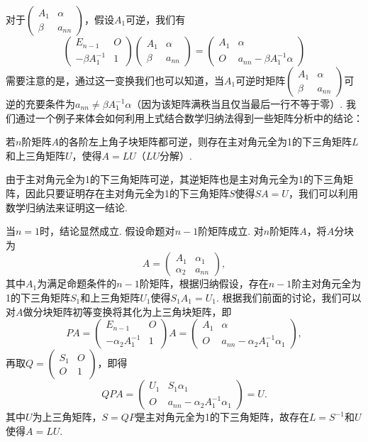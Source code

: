 对于$\begin{pmatrix}
        A_1 & \alpha \\ \beta & a_{nn}
    \end{pmatrix}$，假设$A_1$可逆，我们有
\[\begin{pmatrix}
        E_{n-1} & O \\ -\beta A_1^{-1} & 1
    \end{pmatrix}\begin{pmatrix}
        A_1 & \alpha \\ \beta & a_{nn}
    \end{pmatrix}=\begin{pmatrix}
        A_1 & \alpha \\ O & a_{nn}-\beta A_1^{-1}\alpha
    \end{pmatrix}\]
需要注意的是，通过这一变换我们也可以知道，当$A_1$可逆时矩阵$\begin{pmatrix}
        A_1 & \alpha \\ \beta & a_{nn}
    \end{pmatrix}$可逆的充要条件为$a_{nn}\neq \beta A_1^{-1}\alpha$（因为该矩阵满秩当且仅当最后一行不等于零）. 我们通过一个例子来体会如何利用上式结合数学归纳法得到一些矩阵分析中的结论：
\begin{example}{}{}
    若$n$阶矩阵$A$的各阶左上角子块矩阵都可逆，则存在主对角元全为1的下三角矩阵$L$和上三角矩阵$U$，使得$A=LU$（$LU$分解）.
\end{example}

\begin{solution}
    由于主对角元全为1的下三角矩阵可逆，其逆矩阵也是主对角元全为1的下三角矩阵，因此只要证明存在主对角元全为1的下三角矩阵$S$使得$SA=U$，我们可以利用数学归纳法来证明这一结论.

    当$n=1$时，结论显然成立. 假设命题对$n-1$阶矩阵成立. 对$n$阶矩阵$A$，将$A$分块为
    \[A=\begin{pmatrix}
            A_1 & \alpha_1 \\ \alpha_2 & a_{nn}
        \end{pmatrix},\]
    其中$A_1$为满足命题条件的$n-1$阶矩阵，根据归纳假设，存在$n-1$阶主对角元全为1的下三角矩阵$S_1$和上三角矩阵$U_1$使得$S_1A_1=U_1$. 根据我们前面的讨论，我们可以对$A$做分块矩阵初等变换将其化为上三角块矩阵，即
    \[PA=\begin{pmatrix}
            E_{n-1} & O \\ -\alpha_2A_1^{-1} & 1
        \end{pmatrix}A=\begin{pmatrix}
            A_1 & \alpha \\ O & a_{nn}-\alpha_2A_1^{-1}\alpha_1
        \end{pmatrix},\]
    再取$Q=\begin{pmatrix}
            S_1 & O \\ O & 1
        \end{pmatrix}$，即得
    \[QPA=\begin{pmatrix}
            U_1 & S_1\alpha_1 \\ O & a_{nn}-\alpha_2A_1^{-1}\alpha_1
        \end{pmatrix}=U.\]
    其中$U$为上三角矩阵，$S=QP$是主对角元全为1的下三角矩阵，故存在$L=S^{-1}$和$U$使得$A=LU$.
\end{solution}

